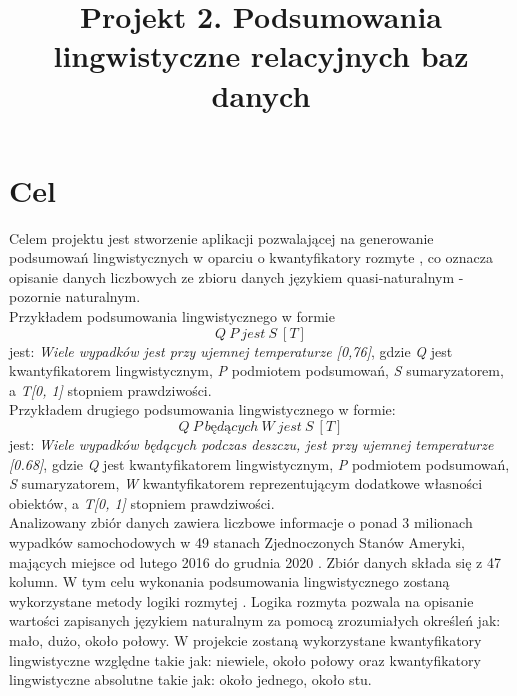 \documentclass{classrep}
\author{
\studentinfo{Julia Szymańska}{224441} \and
\studentinfo{Przemysław Zdrzalik}{224466} }
\title{Projekt 2. Podsumowania lingwistyczne relacyjnych baz danych}
\begin{document}
\maketitle

\section{Cel}
Celem projektu jest stworzenie aplikacji pozwalającej na generowanie podsumowań lingwistycznych \cite{przyklad} w oparciu o kwantyfikatory rozmyte \cite{niewiadomskiRozmyte}, co oznacza opisanie danych liczbowych ze zbioru danych \cite{dane} językiem quasi-naturalnym - pozornie naturalnym. \\Przykładem podsumowania lingwistycznego \cite{przyklad} w formie
\begin{equation} Q\ P\ jest\ S\ [T] \end{equation}
jest: \textit{Wiele wypadków jest przy ujemnej temperaturze [0,76]}, gdzie \textit{Q} jest kwantyfikatorem lingwistycznym, \textit{P} podmiotem podsumowań, \textit{S} sumaryzatorem, a \textit{T[0, 1]} stopniem prawdziwości. \\ \newline Przykładem drugiego podsumowania lingwistycznego w formie:
\begin{equation} Q \ P \ będących\ W\ jest\ S\ [T] \end{equation}
jest: \textit{Wiele wypadków będących podczas deszczu, jest przy ujemnej temperaturze [0.68]}, gdzie \textit{Q} jest kwantyfikatorem lingwistycznym, \textit{P} podmiotem podsumowań, \textit{S} sumaryzatorem, \textit{W} kwantyfikatorem reprezentującym dodatkowe własności obiektów, a \textit{T[0, 1]} stopniem prawdziwości. \\ \newline
Analizowany zbiór danych zawiera liczbowe informacje o ponad 3 milionach wypadków samochodowych w 49 stanach Zjednoczonych Stanów Ameryki, mających miejsce od lutego 2016 do grudnia 2020 \cite{dane}. Zbiór danych składa się z 47 kolumn. W tym celu wykonania podsumowania lingwistycznego zostaną wykorzystane metody logiki rozmytej \cite{fuzzy}. Logika rozmyta pozwala na opisanie wartości zapisanych językiem naturalnym za pomocą zrozumiałych określeń jak: mało, dużo, około połowy. W projekcie zostaną wykorzystane kwantyfikatory lingwistyczne względne takie jak: niewiele, około połowy oraz kwantyfikatory lingwistyczne absolutne takie jak: około jednego, około stu.
\end{document}

